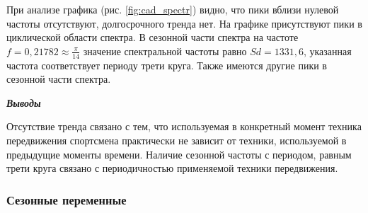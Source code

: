 \documentclass[a4paper,12pt]{article}
\begin{document}
При анализе графика (рис. \ref{fig:cad_spectr}) видно, что пики вблизи нулевой частоты отсутствуют, долгосрочного тренда нет. На графике присутствуют пики в циклической области спектра. 
В сезонной части спектра на частоте $f = 0,21782 \approx \frac{\pi}{14}$ значение спектральной частоты равно $Sd = 1331,6$, указанная частота соответствует периоду трети круга.
Также имеются другие пики в сезонной части спектра.


\textbf{\textit{Выводы}}

Отсутствие тренда связано с тем, что используемая в конкретный момент техника передвижения спортсмена практически не зависит от техники, используемой в предыдущие моменты времени.
Наличие сезонной частоты с периодом, равным трети круга связано с периодичностью применяемой техники передвижения. %

\subsubsection{Сезонные переменные}
\end{document}
